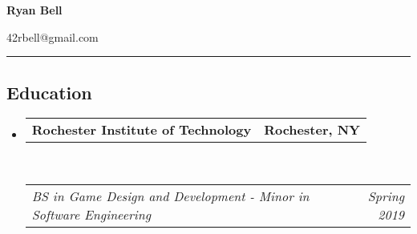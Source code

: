 \documentclass[10pt, letterpaper]{article}
\makeatletter
\newcommand{\headerrow}[2]
{\begin{tabular*}{\linewidth}{l@{\extracolsep{\fill}}r}
	#1 &
	#2 \\
\end{tabular*}}
\makeatother
\begin{document}
\begin{center}
	{\LARGE \textbf{Ryan Bell}}
\\
\end{center}
\noindent
{}\hfill 42rbell@gmail.com\hfill
{}\\
\hrule

\subsection*{Education}
\begin{itemize}
	\parskip=0.1em
	\item[]
	\headerrow
		{\textbf{Rochester Institute of Technology}}
		{\textbf{Rochester, NY}}
	\\
	\headerrow
		{\emph{BS in Game Design and Development - Minor in Software Engineering}}
		{\emph{Spring 2019}}
\end{itemize}
\end{document}
